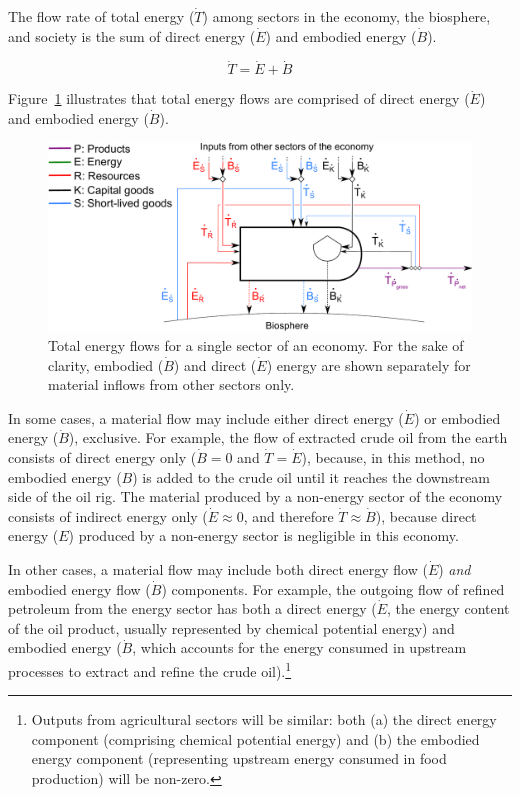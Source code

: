 The flow rate of total energy ($\dot{T}$) among sectors in 
the economy, the biosphere, and society is the sum of
direct energy ($\dot{E}$) and embodied 
energy ($\dot{B}$).

\begin{equation} \label{eq:T_dot_def}
	\dot{T} = \dot{E} + \dot{B}
\end{equation}

\noindent Figure~\ref{fig:embodied_single_producer} illustrates
that total energy flows are comprised of
direct energy ($\dot{E}$) and embodied energy ($\dot{B}$). 

\begin{figure}[h!]
	\centering
		\includegraphics[width=.9\textwidth]{Part_2/Chapter_Embodied/images/PERKS_basic_unit_embodied_energy_content.pdf}
	\caption{Total energy flows for a single sector of an economy. 
	For the sake of clarity, 
	embodied ($\dot{B}$) and direct ($\dot{E}$) energy
	are shown separately for material inflows from other sectors only.}
	\label{fig:embodied_single_producer}
\end{figure}

In some cases, a material flow may include 
either direct energy ($\dot{E}$) 
or embodied energy ($\dot{B}$), exclusive. 
For example, the flow of extracted crude oil from the earth 
consists of direct energy only ($\dot{B} = 0$ and $\dot{T} = \dot{E}$), 
because, in this method, no embodied energy ($B$) is added 
to the crude oil until it reaches the downstream side of the oil rig.
The material produced by a non-energy sector of the economy 
consists of indirect energy only ($\dot{E} \approx 0$, 
and therefore $\dot{T} \approx \dot{B}$), 
because direct energy ($E$) produced by 
a non-energy sector is negligible in this economy. 

In other cases, a material flow may include both direct energy flow
($\dot{E}$) \emph{and} embodied energy flow ($\dot{B}$) components.
For example, the outgoing flow of refined petroleum from the energy sector 
has both a direct energy ($\dot{E}$, the energy content of the oil product, 
usually represented by chemical potential energy) 
and embodied energy ($\dot{B}$, which accounts for the energy 
consumed in upstream processes 
to extract and refine the crude oil).\footnote{Outputs from 
agricultural sectors will be similar: 
both (a) the direct energy component (comprising chemical potential energy) 
and (b) the embodied energy component (representing upstream
energy consumed in food production) will be non-zero.}

